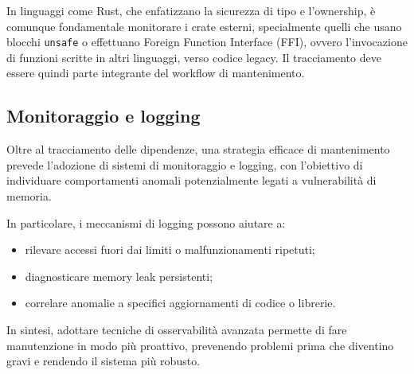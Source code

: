In linguaggi come Rust, che enfatizzano la sicurezza di tipo e l'ownership, è
comunque fondamentale monitorare i crate esterni, specialmente quelli che usano blocchi
\texttt{unsafe} o effettuano Foreign Function Interface (FFI), ovvero l'invocazione
di funzioni scritte in altri linguaggi, verso codice legacy. Il tracciamento deve
essere quindi parte integrante del workflow di mantenimento.

\subsection{Monitoraggio e logging}
\label{sec:monitoraggio-logging}

Oltre al tracciamento delle dipendenze, una strategia efficace di mantenimento prevede
l'adozione di sistemi di monitoraggio e logging, con l'obiettivo di individuare
comportamenti anomali potenzialmente legati a vulnerabilità di memoria.

In particolare, i meccanismi di logging possono aiutare a:
\begin{itemize}
  \item rilevare accessi fuori dai limiti o malfunzionamenti ripetuti;

  \item diagnosticare memory leak persistenti;

  \item correlare anomalie a specifici aggiornamenti di codice o librerie.
\end{itemize}

In sintesi, adottare tecniche di osservabilità avanzata permette di fare
manutenzione in modo più proattivo, prevenendo problemi prima che diventino gravi
e rendendo il sistema più robusto.